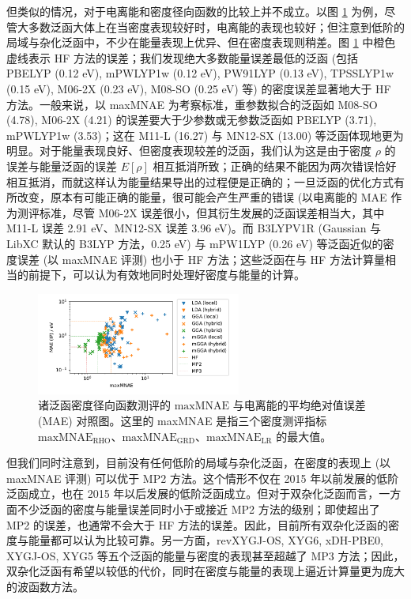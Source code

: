 但类似的情况，对于电离能和密度径向函数的比较上并不成立。以图 \ref{fig.compare-err-maxMNAE-MAEIP} 为例，尽管大多数泛函大体上在当密度表现较好时，电离能的表现也较好；但注意到低阶的局域与杂化泛函中，不少在能量表现上优异、但在密度表现则稍差。图 \ref{fig.compare-err-maxMNAE-MAEIP} 中橙色虚线表示 HF 方法的误差；我们发现绝大多数能量误差最低的泛函 (包括 PBELYP (0.12 eV), mPWLYP1w (0.12 eV), PW91LYP (0.13 eV), TPSSLYP1w (0.15 eV), M06-2X (0.23 eV), M08-SO (0.25 eV) 等) 的密度误差显著地大于 HF 方法。一般来说，以 maxMNAE 为考察标准，重参数拟合的泛函如 M08-SO (4.78), M06-2X (4.21) 的误差要大于少参数或无参数泛函如 PBELYP (3.71), mPWLYP1w (3.53)；这在 M11-L (16.27) 与 MN12-SX (13.00) 等泛函体现地更为明显。对于能量表现良好、但密度表现较差的泛函，我们认为这是由于密度 $\rho$ 的误差与能量泛函的误差 $E[\rho]$ 相互抵消所致；正确的结果不能因为两次错误恰好相互抵消，而就这样认为能量结果导出的过程便是正确的\cite{Hammes-Schiffer-Hammes-Schiffer.S.2017, Korth-Korth.ACIE.2017, Graziano-Graziano.NRC.2017}；一旦泛函的优化方式有所改变，原本有可能正确的能量，很可能会产生严重的错误 (以电离能的 MAE 作为测评标准，尽管 M06-2X 误差很小，但其衍生发展的泛函误差相当大，其中 M11-L 误差 2.91 eV、MN12-SX 误差 3.96 eV)。而 B3LYPV1R (Gaussian 与 LibXC 默认的 B3LYP 方法，0.25 eV) 与 mPW1LYP (0.26 eV) 等泛函近似的密度误差 (以 maxMNAE 评测) 也小于 HF 方法；这些泛函在与 HF 方法计算量相当的前提下，可以认为有效地同时处理好密度与能量的计算。

\begin{figure}[t]
    \centering
    \caption{诸泛函密度径向函数测评的 $\text{maxMNAE}$ 与电离能的平均绝对值误差 (MAE) 对照图。这里的 maxMNAE 是指三个密度测评指标 $\text{maxMNAE}_\text{RHO}$、$\text{maxMNAE}_\text{GRD}$、$\text{maxMNAE}_\text{LR}$ 的最大值。}
    \label{fig.compare-err-maxMNAE-MAEIP}
    \includegraphics[width=0.6\textwidth]{assets/compare-err-maxMNAE-MAEIP.pdf}
\end{figure}

但我们同时注意到，目前没有任何低阶的局域与杂化泛函，在密度的表现上 (以 maxMNAE 评测) 可以优于 MP2 方法。这个情形不仅在 2015 年以前发展的低阶泛函成立，也在 2015 年以后发展的低阶泛函成立。但对于双杂化泛函而言，一方面不少泛函的密度与能量误差同时小于或接近 MP2 方法的级别；即使超出了 MP2 的误差，也通常不会大于 HF 方法的误差。因此，目前所有双杂化泛函的密度与能量都可以认为比较可靠。另一方面，revXYGJ-OS, XYG6, xDH-PBE0, XYGJ-OS, XYG5 等五个泛函的能量与密度的表现甚至超越了 MP3 方法；因此，双杂化泛函有希望以较低的代价，同时在密度与能量的表现上逼近计算量更为庞大的波函数方法。

